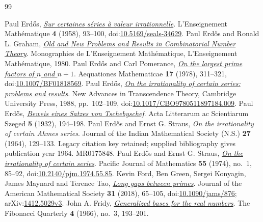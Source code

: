 \begin{thebibliography}{99}
\small\raggedright\setlength{\itemsep}{0pt}
 Paul Erd\H{o}s, \href{https://users.renyi.hu/~p_erdos/1958-19.pdf}{\emph{Sur certaines s\'eries \`a valeur irrationnelle}}.
  L'Enseignement Mathématique \textbf{4} (1958), 93--100, doi:\href{https://doi.org/10.5169/seals-34629}{10.5169/seals-34629}.
 Paul Erd\H{o}s and Ronald L. Graham, \href{https://mathweb.ucsd.edu/~ronspubs/80_11_number_theory.pdf}{\emph{Old and New Problems and Results in Combinatorial Number Theory}}.
  Monographies de L'Enseignement Mathématique, L'Enseignement Mathématique, 1980.
 Paul Erd\H{o}s and Carl Pomerance, \href{https://doi.org/10.1007/BF01818569}{\emph{On the largest prime factors of $n$ and $n+1$}}.
  Aequationes Mathematicae \textbf{17} (1978), 311--321, doi:\href{https://doi.org/10.1007/BF01818569}{10.1007/BF01818569}.
 Paul Erd\H{o}s, \href{https://doi.org/10.1017/CBO9780511897184.009}{\emph{On the irrationality of certain series: problems and results}}.
  New Advances in Transcendence Theory, Cambridge University Press, 1988, pp.~102--109, doi:\href{https://doi.org/10.1017/CBO9780511897184.009}{10.1017/CBO9780511897184.009}.
 Paul Erd\H{o}s, \href{https://users.renyi.hu/~p_erdos/1932-01.pdf}{\emph{Beweis eines Satzes von Tschebyschef}}.
  Acta Litterarum ac Scientiarum Szeged \textbf{5} (1932), 194--198.
 Paul Erd\H{o}s and Ernst G. Straus, \emph{On the irrationality of certain Ahmes series}.
  Journal of the Indian Mathematical Society (N.S.) \textbf{27} (1964), 129--133. Legacy citation key retained; supplied bibliography gives publication year 1964. MR0175848.
 Paul Erd\H{o}s and Ernst G. Straus, \href{https://doi.org/10.2140/pjm.1974.55.85}{\emph{On the irrationality of certain series}}.
  Pacific Journal of Mathematics \textbf{55} (1974), no.~1, 85--92, doi:\href{https://doi.org/10.2140/pjm.1974.55.85}{10.2140/pjm.1974.55.85}.
 Kevin Ford, Ben Green, Sergei Konyagin, James Maynard and Terence Tao, \href{https://arxiv.org/abs/1412.5029v3}{\emph{Long gaps between primes}}.
  Journal of the American Mathematical Society \textbf{31} (2018), 65--105, doi:\href{https://doi.org/10.1090/jams/876}{10.1090/jams/876}; arXiv:\href{https://arxiv.org/abs/1412.5029v3}{1412.5029v3}.
 John A. Fridy, \href{https://www.fq.math.ca/Scanned/4-3/fridy.pdf}{\emph{Generalized bases for the real numbers}}.
  The Fibonacci Quarterly \textbf{4} (1966), no.~3, 193--201.

\end{thebibliography}

